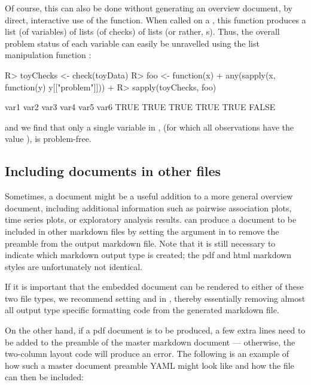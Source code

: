 \documentclass[article,shortnames]{jss}
\begin{document}
Of course, this can also be done without generating an overview
document, by direct, interactive use of the  function. When
called on a , this function produces a list (of
variables) of lists (of checks) of lists (or rather,
s). Thus, the overall problem status of each variable
can easily be unravelled using the list manipulation function
:

\begin{Schunk}
\begin{Sinput}
R> toyChecks <- check(toyData)
R> foo <- function(x) {
+    any(sapply(x, function(y) y[["problem"]]))
+  }
R> sapply(toyChecks, foo)
\end{Sinput}
\begin{Soutput}
 var1  var2  var3  var4  var5  var6 
 TRUE  TRUE  TRUE  TRUE  TRUE FALSE 
\end{Soutput}
\end{Schunk}

and we find that only a single variable in ,  (for which all
observations have the value ), is problem-free.


\subsection[Including dataMaid documents in other files]{Including  documents in other files}
Sometimes, a  document might be a useful addition to a
more general overview document, including additional information such
as pairwise association plots, time series plots, or exploratory
analysis results.   can produce a document to be
included in other  markdown files by setting the
 argument in  to remove the preamble
from the output  markdown file. Note that it is still
necessary to indicate which  markdown output type is
created; the pdf and html  markdown styles are
unfortunately not identical.

If it is important that the embedded  document can be
rendered to either of these two file types, we recommend setting
 and  in , thereby
essentially removing almost all output type specific formatting code
from the generated  markdown file.

On the other hand, if a pdf document is to be produced, a few extra
lines need to be added to the preamble of the master  markdown
document --- otherwise, the two-column layout code will produce an
error. The following is an example of how such a master document
preamble YAML might look like and how the  file can
then be included:
\end{document}
